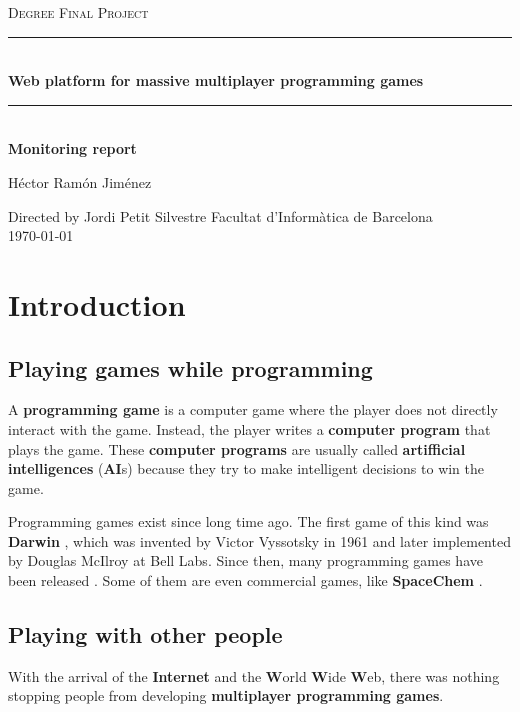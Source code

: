 \documentclass[a4paper,11pt]{article}
\begin{document}
\begin{titlepage}
\begin{center}
\textsc{\Large Degree Final Project}
\\[1.5cm]
\rule{\linewidth}{0.5mm}
\\[0.4cm]
{\huge
\bfseries
Web platform for massive multiplayer programming games
\\[0.4cm]
}
\rule{\linewidth}{0.5mm}
\\[0.3cm]
{\bfseries
Monitoring report
}
\\[2.5cm]
\begin{center}
\large
Héctor Ramón Jiménez
\end{center}
Directed by Jordi Petit Silvestre
\vfill
{\large
Facultat d'Informàtica de Barcelona
}
\\[0.5cm]
{\large
\today
}
\end{center}
\end{titlepage}
\clearpage
\tableofcontents
\clearpage
\section{Introduction}
\subsection{Playing games while programming}

A \textbf{programming game} is a computer game where the player does not directly interact
  with the game. Instead, the player writes a \textbf{computer program} that plays the game. These \textbf{computer programs}
  are usually called \textbf{artifficial intelligences} (\textbf{AI}s) because they try to make intelligent decisions to win the game.

  Programming games exist since long time ago. The first game of this kind was \textbf{Darwin} \cite{darwin},
  which was invented by Victor Vyssotsky in 1961 and later implemented by Douglas McIlroy at Bell Labs. Since then,
  many programming games have been released \cite{pg}. Some of them are even commercial games, like \textbf{SpaceChem} \cite{spacechem}.
\subsection{Playing with other people}
With the arrival of the \textbf{Internet} and the \textbf{W}orld \textbf{W}ide \textbf{W}eb, there was nothing stopping people from developing
  \textbf{multiplayer programming games}.
\end{document}
